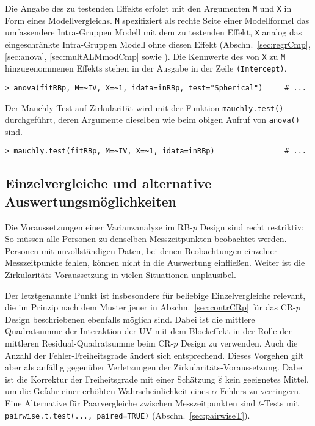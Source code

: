 Die Angabe des zu testenden Effekts erfolgt mit den Argumenten \lstinline!M! und \lstinline!X! in Form eines Modellvergleichs. \lstinline!M! spezifiziert als rechte Seite einer Modellformel das umfassendere Intra-Gruppen Modell mit dem zu testenden Effekt, \lstinline!X! analog das eingeschränkte Intra-Gruppen Modell ohne diesen Effekt (Abschn.\ \ref{sec:regrCmp}, \ref{sec:anova}, \ref{sec:multALMmodCmp} sowie ). Die Kennwerte des von \lstinline!X! zu \lstinline!M! hinzugenommenen Effekts stehen in der Ausgabe in der Zeile \lstinline!(Intercept)!.
\begin{lstlisting}
> anova(fitRBp, M=~IV, X=~1, idata=inRBp, test="Spherical")     # ...
\end{lstlisting}

Der Mauchly-Test auf Zirkularität wird mit der Funktion  \lstinline!mauchly.test()! durchgeführt, deren Argumente dieselben wie beim obigen Aufruf von \lstinline!anova()! sind.
\begin{lstlisting}
> mauchly.test(fitRBp, M=~IV, X=~1, idata=inRBp)                # ...
\end{lstlisting}

\subsection{Einzelvergleiche und alternative Auswertungsmöglichkeiten}
\label{sec:contrRBp}

Die Voraussetzungen einer Varianzanalyse im RB-$p$ Design sind recht restriktiv: So müssen alle Personen zu denselben Messzeitpunkten beobachtet werden. Personen mit unvollständigen Daten, bei denen Beobachtungen einzelner Messzeitpunkte fehlen, können nicht in die Auswertung einfließen. Weiter ist die Zirkularitäts-Voraussetzung in vielen Situationen unplausibel.

Der letztgenannte Punkt ist insbesondere für beliebige Einzelvergleiche relevant, die im Prinzip nach dem Muster jener in Abschn.\ \ref{sec:contrCRp} für das CR-$p$ Design beschriebenen ebenfalls möglich sind. Dabei ist die mittlere Quadratsumme der Interaktion der UV mit dem Blockeffekt in der Rolle der mittleren Residual-Quadratsumme beim CR-$p$ Design zu verwenden. Auch die Anzahl der Fehler-Freiheitsgrade ändert sich entsprechend. Dieses Vorgehen gilt aber als anfällig gegenüber Verletzungen der Zirkularitäts-Voraussetzung. Dabei ist die Korrektur der Freiheitsgrade mit einer Schätzung $\hat{\varepsilon}$ kein geeignetes Mittel, um die Gefahr einer erhöhten Wahrscheinlichkeit eines $\alpha$-Fehlers zu verringern. Eine Alternative für Paarvergleiche zwischen Messzeitpunkten sind $t$-Tests mit \lstinline!pairwise.t.test(..., paired=TRUE)! (Abschn.\ \ref{sec:pairwiseT}).


